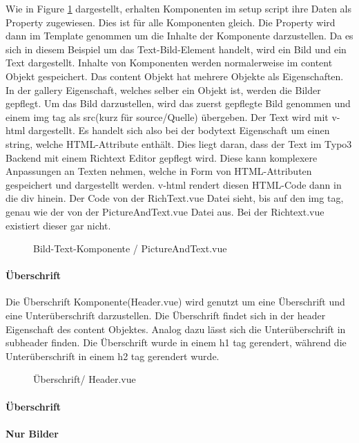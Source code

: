 Wie in Figure \ref{fig:Bild-Text-Komponente} dargestellt, erhalten Komponenten im setup script ihre Daten als Property zugewiesen. Dies ist für alle Komponenten gleich. Die Property wird dann im Template genommen um die Inhalte der Komponente darzustellen. Da es sich in diesem Beispiel um das Text-Bild-Element handelt, wird ein Bild und ein Text dargestellt. Inhalte von Komponenten werden normalerweise im content Objekt gespeichert. Das content Objekt hat mehrere Objekte als Eigenschaften. In der gallery Eigenschaft, welches selber ein Objekt ist, werden die Bilder gepflegt. Um das Bild darzustellen, wird das zuerst gepflegte Bild genommen und einem img tag als src(kurz für source/Quelle) übergeben. Der Text wird mit v-html dargestellt. Es handelt sich also bei der bodytext Eigenschaft um einen string, welche HTML-Attribute enthält. Dies liegt daran, dass der Text im Typo3 Backend mit einem Richtext Editor gepflegt wird. Diese kann komplexere Anpassungen an Texten nehmen, welche in Form von HTML-Attributen gespeichert und dargestellt werden. v-html rendert diesen HTML-Code dann in die div hinein. Der Code von der RichText.vue Datei sieht, bis auf den img tag, genau wie der von der PictureAndText.vue Datei aus. Bei der Richtext.vue existiert dieser gar nicht.

\begin{figure}[htb]
\centering
{}
\caption{Bild-Text-Komponente / PictureAndText.vue}
\label{fig:Bild-Text-Komponente}
\end{figure}
\paragraph{Überschrift}
Die Überschrift Komponente(Header.vue) wird genutzt um eine Überschrift und eine Unterüberschrift darzustellen. Die Überschrift findet sich in der header Eigenschaft des content Objektes. Analog dazu lässt sich die Unterüberschrift in subheader finden. Die Überschrift wurde in einem h1 tag gerendert, während die Unterüberschrift in einem h2 tag gerendert wurde.

\begin{figure}[htb]
\centering
{}
\caption{Überschrift/ Header.vue}
\label{fig:berschrift/ Header.vue}
\end{figure}
\paragraph{Überschrift}
\paragraph{Nur Bilder}

